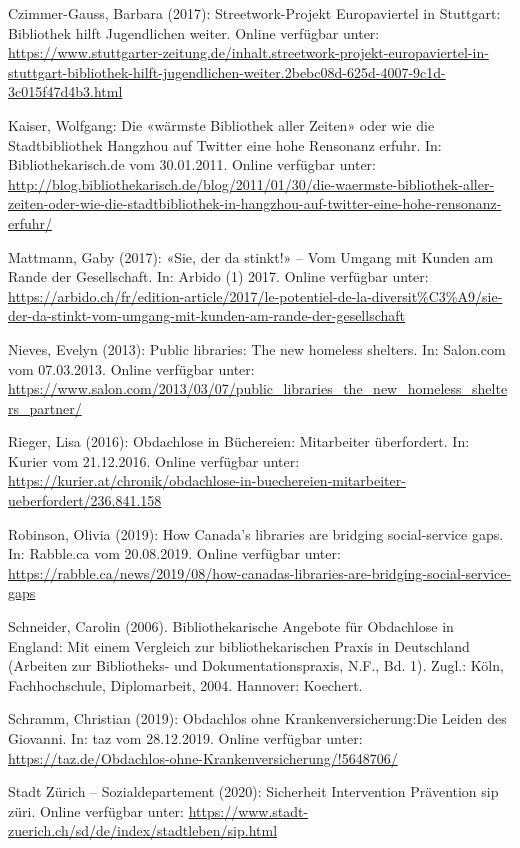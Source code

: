 \documentclass[a4paper,
fontsize=11pt,
oneside,
numbers=noperiodatend,
parskip=half-,
bibliography=totoc,
final
]{scrartcl}
\begin{document}
Czimmer-Gauss, Barbara (2017): Streetwork-Projekt Europaviertel in
Stuttgart: Bibliothek hilft Jugendlichen weiter. Online verfügbar unter:
\url{https://www.stuttgarter-zeitung.de/inhalt.streetwork-projekt-europaviertel-in-stuttgart-bibliothek-hilft-jugendlichen-weiter.2bebc08d-625d-4007-9c1d-3c015f47d4b3.html}

Kaiser, Wolfgang: Die «wärmste Bibliothek aller Zeiten» oder wie die
Stadtbibliothek Hangzhou auf Twitter eine hohe Rensonanz erfuhr. In:
Bibliothekarisch.de vom 30.01.2011. Online verfügbar unter:
\url{http://blog.bibliothekarisch.de/blog/2011/01/30/die-waermste-bibliothek-aller-zeiten-oder-wie-die-stadtbibliothek-in-hangzhou-auf-twitter-eine-hohe-rensonanz-erfuhr/}

Mattmann, Gaby (2017): «Sie, der da stinkt!» -- Vom Umgang mit Kunden am
Rande der Gesellschaft. In: Arbido (1) 2017. Online verfügbar unter:
\url{https://arbido.ch/fr/edition-article/2017/le-potentiel-de-la-diversit\%C3\%A9/sie-der-da-stinkt-vom-umgang-mit-kunden-am-rande-der-gesellschaft}

Nieves, Evelyn (2013): Public libraries: The new homeless shelters. In:
Salon.com vom 07.03.2013. Online verfügbar unter:
\url{https://www.salon.com/2013/03/07/public_libraries_the_new_homeless_shelters_partner/}

Rieger, Lisa (2016): Obdachlose in Büchereien: Mitarbeiter überfordert.
In: Kurier vom 21.12.2016. Online verfügbar unter:
\url{https://kurier.at/chronik/obdachlose-in-buechereien-mitarbeiter-ueberfordert/236.841.158}

Robinson, Olivia (2019): How Canada's libraries are bridging
social-service gaps. In: Rabble.ca vom 20.08.2019. Online verfügbar
unter:
\url{https://rabble.ca/news/2019/08/how-canadas-libraries-are-bridging-social-service-gaps}

Schneider, Carolin (2006). Bibliothekarische Angebote für Obdachlose in
England: Mit einem Vergleich zur bibliothekarischen Praxis in
Deutschland (Arbeiten zur Bibliotheks- und Dokumentationspraxis, N.F.,
Bd. 1). Zugl.: Köln, Fachhochschule, Diplomarbeit, 2004. Hannover:
Koechert.

Schramm, Christian (2019): Obdachlos ohne Krankenversicherung:Die Leiden
des Giovanni. In: taz vom 28.12.2019. Online verfügbar unter:
\url{https://taz.de/Obdachlos-ohne-Krankenversicherung/!5648706/}

Stadt Zürich -- Sozialdepartement (2020): Sicherheit Intervention
Prävention sip züri. Online verfügbar unter:
\url{https://www.stadt-zuerich.ch/sd/de/index/stadtleben/sip.html}
\end{document}
